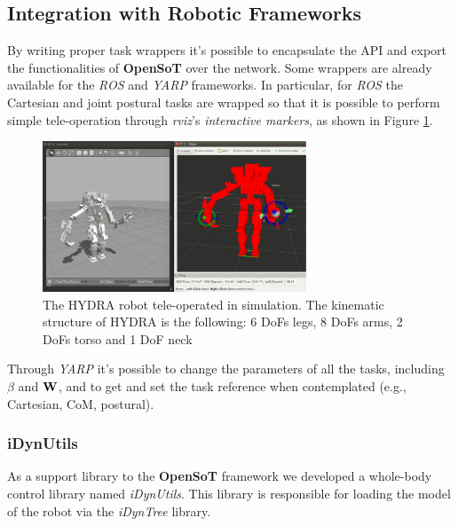 \subsection{Integration with Robotic Frameworks}
\label{sec:integration_with_robotic_frameworks}
By writing proper task wrappers it's possible to encapsulate the API and export the functionalities of \textbf{OpenSoT} over the network. Some wrappers are already available for the \emph{ROS} and \emph{YARP} frameworks. In particular, for \emph{ROS} the Cartesian and joint postural tasks are wrapped so that it is possible to perform simple tele-operation  through \emph{rviz}'s \emph{interactive markers}, as shown in Figure \ref{opensot_interactive_markers}.
\begin{figure}[!ht]
\vspace{2 mm}
\centering
\includegraphics[width=0.7\textwidth]{images/software/hydra_tele_operation.eps}
\caption{The HYDRA robot tele-operated in simulation. The kinematic structure of HYDRA is the following: 6 DoFs legs, 8 DoFs arms, 2 DoFs torso and 1 DoF neck}
\label{opensot_interactive_markers}
\end{figure}
Through \emph{YARP} it's possible to change the parameters of all the tasks, including $\beta$ and $\mathbf{W}$, and to get and set the task reference when contemplated (e.g., Cartesian, CoM, postural).

\subsubsection{iDynUtils}
\label{sec:idynutils}

As a support library to the \textbf{OpenSoT} framework we developed a whole-body control library named \emph{iDynUtils}.
This library is responsible for loading the model of the robot via the \emph{iDynTree}\cite{Nori2015-zb,Nori2015-db} library.

